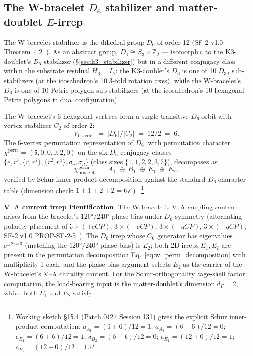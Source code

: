 \documentclass[11pt,letterpaper]{article}
\newcommand{\Dsix}{D_6}
\newcommand{\Sthree}{S_3}
\begin{document}
\subsection{The W-bracelet $\Dsix$ stabilizer and matter-doublet $E$-irrep}\label{sec:w_d6_stabilizer}

The W-bracelet stabilizer is the dihedral group $\Dsix$ of order 12 (SF-2 v1.0 Theorem~4.2~\cite{abshier_sf2}). As an abstract group, $\Dsix \cong \Sthree \times \mathbb{Z}_2$ --- isomorphic to the K3-doublet's $\Dsix$ stabilizer (\S\ref{sec:k3_stabilizer}) but in a different conjugacy class within the substrate residual $H_3 = I_h$: the K3-doublet's $\Dsix$ is one of 10 $D_{3d}$ sub-stabilizers (at the icosahedron's 10 3-fold rotation axes), while the W-bracelet's $\Dsix$ is one of 10 Petrie-polygon sub-stabilizers (at the icosahedron's 10 hexagonal Petrie polygons in dual configuration).

The W-bracelet's 6 hexagonal vertices form a single transitive $\Dsix$-orbit with vertex stabilizer $C_2$ of order 2:
\begin{equation}\label{eq:w_orbit_stabilizer}
V_{\text{bracelet}} \;=\; |\Dsix|/|C_2| \;=\; 12/2 \;=\; 6.
\end{equation}
The 6-vertex permutation representation of $\Dsix$, with permutation character $\chi^{\text{perm}} = (6, 0, 0, 0, 2, 0)$ on the six $\Dsix$ conjugacy classes $\{e, r^3, \{r, r^5\}, \{r^2, r^4\}, \sigma_v, \sigma_d\}$ (class sizes $\{1, 1, 2, 2, 3, 3\}$), decomposes as:
\begin{equation}\label{eq:w_perm_decomposition}
\chi^{\text{perm}}_{\text{bracelet}} \;=\; A_1 \;\oplus\; B_1 \;\oplus\; E_1 \;\oplus\; E_2,
\end{equation}
verified by Schur inner-product decomposition against the standard $\Dsix$ character table (dimension check: $1 + 1 + 2 + 2 = 6 \checkmark$)~\cite{abshier_capotauro_chiral_mechanism_sketch}.\footnote{Working sketch \S15.4 (Patch 0427 Session 131) gives the explicit Schur inner-product computation: $a_{A_1} = (6 + 6)/12 = 1$; $a_{A_2} = (6 - 6)/12 = 0$; $a_{B_1} = (6 + 6)/12 = 1$; $a_{B_2} = (6 - 6)/12 = 0$; $a_{E_1} = (12 + 0)/12 = 1$; $a_{E_2} = (12 + 0)/12 = 1$.}

\textbf{V--A current irrep identification.} The W-bracelet's V--A coupling content arises from the bracelet's $120°/240°$ phase bias under $\Dsix$ symmetry (alternating-polarity placement of $3 \times (+eCP)$, $3 \times (-eCP)$, $3 \times (+qCP)$, $3 \times (-qCP)$; SF-2 v1.0 PROP-SF-2-5~\cite{abshier_sf2}). The $\Dsix$ irrep whose $C_6$ generator has eigenvalues $e^{\pm 2\pi i/3}$ (matching the $120°/240°$ phase bias) is $E_2$; both 2D irreps $E_1, E_2$ are present in the permutation decomposition Eq.~\eqref{eq:w_perm_decomposition} with multiplicity 1 each, and the phase-bias argument selects $E_2$ as the carrier of the W-bracelet's V--A chirality content. For the Schur-orthogonality cage-shell factor computation, the load-bearing input is the matter-doublet's dimension $d_\Gamma = 2$, which both $E_1$ and $E_2$ satisfy.
\end{document}
